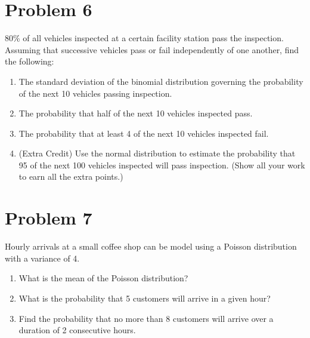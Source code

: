 \documentclass[12pt,twoside]{article}
\newcommand{\pts}[1]{\marginpar{ \small\hspace{0pt} \textit{[#1]} } }
\newcommand{\?}{\stackrel{?}{=}}
\begin{document}
\eject
\section*{Problem 6 }

80\% of all vehicles inspected  at a certain facility station pass the inspection.
Assuming that successive vehicles pass or fail independently of one another, find the following:
\begin{enumerate}[\bf (a)]
\item The standard deviation \pts{2} of the binomial distribution governing the probability of the next 10 vehicles passing inspection.
  \vspace{20ex}
  
\item The probability that half of the next 10 vehicles inspected pass. \pts{3}
  \vspace{30ex}
  
\item The probability that at least 4 of the next 10 vehicles inspected fail. \pts{4} %
  \vspace{30ex}

  \eject

\item (Extra Credit) Use the normal distribution \pts{5} to estimate the probability that 95 of the next 100 vehicles inspected will pass inspection. (Show all your work to earn all the extra points.)
\end{enumerate}

\eject

\section*{Problem 7 }

Hourly arrivals at a small coffee shop can be model using a Poisson distribution with a variance of 4.

\begin{enumerate}[\bf (a)]
\item What is the mean of the Poisson distribution?\pts{2}
  \vspace{20ex}

\item What is the probability that \pts{2} 5 customers will arrive in a given hour?
  \vspace{30ex}

\item Find the \pts{4} probability that no more than 8 customers will arrive over a duration of 2 consecutive hours.
  
\end{enumerate}
\end{document}
